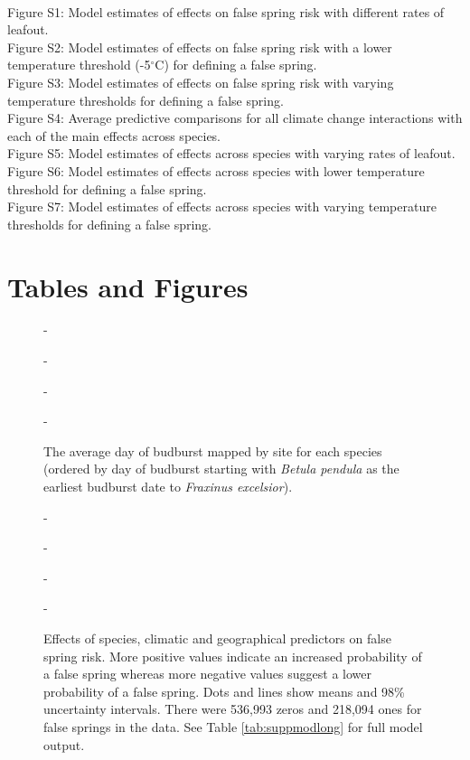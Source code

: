 \documentclass{article}\usepackage[]{graphicx}\usepackage[]{color}
\begin{document}
\vspace{2ex}\\
Figure S1: Model estimates of effects on false spring risk with different rates of leafout. \\
Figure S2: Model estimates of effects on false spring risk with a lower temperature threshold (-5$^{\circ}$C) for defining a false spring. \\
Figure S3: Model estimates of effects on false spring risk with varying temperature thresholds for defining a false spring. \\
Figure S4:  Average predictive comparisons for all climate change interactions with each of the main effects across species. \\ 
Figure S5: Model estimates of effects across species with varying rates of leafout. \\
Figure S6: Model estimates of effects across species with lower temperature threshold for defining a false spring. \\
Figure S7: Model estimates of effects across species with varying temperature thresholds for defining a false spring. \\

\section*{Tables and Figures} 

{\begin{figure} [H]
  -\begin{center}
  -\caption{The average day of budburst mapped by site for each species (ordered by day of budburst starting with \textit{Betula pendula} as the earliest budburst date to \textit{Fraxinus excelsior}). }\label{fig:bbmap}
  -\end{center}
  -\end{figure}}
  
{\begin{figure} [H]
  -\begin{center}
  -\caption{Effects of species, climatic and geographical predictors on false spring risk. More positive values indicate an increased probability of a false spring whereas more negative values suggest a lower probability of a false spring. Dots and lines show means and 98\% uncertainty intervals. There were 536,993 zeros and 218,094 ones for false springs in the data. See Table \ref{tab:suppmodlong} for full model output.}\label{fig:maineffects}
  -\end{center}
  -\end{figure}}
  
\end{document}
